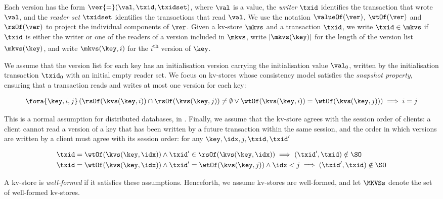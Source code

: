 Each version has the form 
\(\ver {=} (\val, \txid, \txidset)\), where \(\val\) is
a value, the \emph{writer} \(\txid\) identifies the transaction that
wrote \(\val\),  and the \emph{reader set} \(\txidset\) identifies the
transactions that read \(\val\). We use the notation 
\(\valueOf(\ver)\),
\(\wtOf(\ver)\) and \(\rsOf(\ver)\) to project
the individual components of \(\ver\).
Given a kv-store \(\mkvs\) and a transaction \(\txid\), we write 
\(\txid \in \mkvs\) if \(\txid\) is either the writer or 
one of the readers of a version included in \(\mkvs\), 
write \(\lvert \mkvs(\key) \rvert\) for the length of the version
list \(\mkvs(\key)\),
and write \(\mkvs(\key, i)\) for the \(i\)\textsuperscript{th} version of \(\key\).

We assume that the version list for each key has an initialisation version 
carrying the initialisation value \(\val_0\),  written by the 
initialisation transaction \(\txid_0\) with an initial empty reader set.
We focus on kv-stores whose consistency model satisfies the
\emph{snapshot property}, ensuring that
a transaction reads and writes at most one version for each key:

\SpaceAboveMath
\begin{align}
\fora{\key, i, j} 
\left( \rsOf(\kvs(\key, i)) \cap \rsOf(\kvs(\key, j)) \neq \emptyset \lor
\wtOf(\kvs(\key, i)) = \wtOf(\kvs(\key, j)) \right)
\implies i = j  
\label{equ:kvs-wf-txid-snapshot-property} 
\end{align}
\SpaceBelowMath

\noindent 
This is a normal assumption for distributed databases, \eg in \cite{ramp,rola,cops,wren,redblue,PSI,NMSI,gdur,clocksi,distrsi}.
Finally, we assume that the kv-store agrees with the session order of clients: 
a client cannot read a
version of a key that has been written by a future transaction within
the same session, and the order in which versions are written by a
client must agree with its session order:
for any \( \key,\idx,j,\txid,\txid' \)

\SpaceAboveMath
\begin{align}
& \txid = \wtOf(\kvs(\key,\idx))
\land \txid' \in \rsOf(\kvs(\key,\idx))
\implies (\txid', \txid) \notin \SO
\label{equ:kvs-wf-so-wr}
\\ & \txid = \wtOf(\kvs(\key,\idx))
\land \txid' = \wtOf(\kvs(\key,j))
\land \idx < j
\implies (\txid', \txid) \notin \SO
\label{equ:kvs-wf-so-ww}
\end{align}
\SpaceBelowMath

\noindent A kv-store is
\emph{well-formed} if it satisfies these assumptions.
Henceforth, we assume kv-stores are well-formed,
and let \(\MKVSs\) denote the set of well-formed kv-stores.

